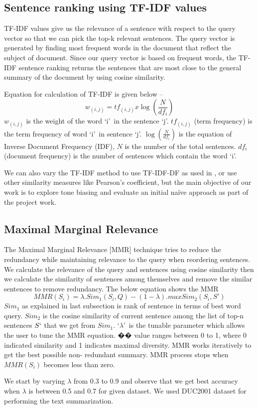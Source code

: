 \documentclass[conference]{IEEEtran}
\begin{document}
\subsection{Sentence ranking using TF-IDF values}
TF-IDF values give us the relevance of a sentence with respect to the query vector so that we can pick the top-k relevant sentences. The query vector is generated by finding most frequent words in the document that reflect the subject of document. Since our query vector is based on frequent words, the TF-IDF sentence ranking returns the sentences that are most close to the general summary of the document by using cosine similarity. 
\par
Equation for calculation of TF-IDF is given below –
$$w_{(i,j)}=tf_{(i,j)}x\log(\frac{N}{df_i})$$
$w_{(i,j)}$ is the weight of the word \lq i\rq \ in the sentence \lq j\rq .
$tf_{(i,j)}$ (term frequency) is the term frequency of word \lq i\rq \ in sentence \lq j\rq . $\log(\frac{N}{df_i})$ is the equation of Inverse Document Frequency (IDF), $N$ is the number of the total sentences. $df_i$ (document frequency) is the number of sentences which contain the word \lq i\rq  .
\par
We can also vary the TF-IDF method to use TF-IDF-DF as used in \citep{paper6}, or use other similarity measures like Pearson’s coefficient, but the main objective of our work is to explore tone biasing and evaluate an initial naïve approach as part of the project work.

\subsection{Maximal Marginal Relevance}
The Maximal Marginal Relevance [MMR] technique tries to reduce the redundancy while maintaining relevance to the query when reordering sentences. We calculate the relevance of the query and sentences using cosine similarity then we calculate the similarity of sentences among themselves and remove the similar sentences to remove redundancy. The below equation shows the MMR
$$MMR(S_i)=\lambda .Sim_1(S_i, Q)-(1-\lambda).max Sim_2(S_i,S')$$
$Sim_1$ as explained in last subsection is rank of sentence in terms of best word query. $Sim_2$ is the cosine similarity of current sentence among the list of top-n sentences $S`$ that we get from $Sim_1$. \lq$\lambda$\rq \ is the tunable parameter which allows the user to tune the MMR equation. �� value ranges between 0 to 1, where 0 indicated similarity and 1 indicates maximal diversity. MMR works iteratively to get the best possible non- redundant summary. MMR process stops when $MMR(S_i)$ becomes less than zero.
\par
We start by varying $\lambda$ from 0.3 to 0.9 and observe
that we get best accuracy when $\lambda$ is between 0.5 and 0.7
for given dataset. We used DUC2001 dataset for
performing the text summarization.
\end{document}

